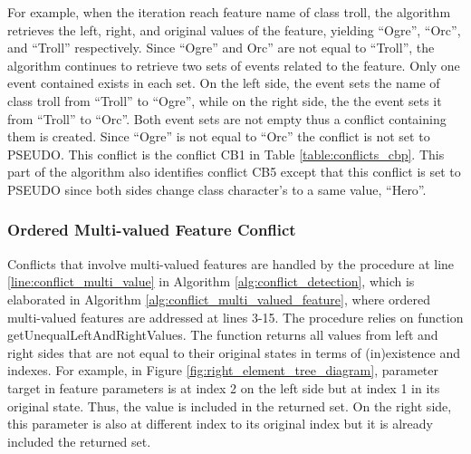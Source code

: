 For example, when the iteration reach feature \textsf{name} of class \textsf{troll}, the algorithm retrieves the left, right, and original values of the feature, yielding ``Ogre'', ``Orc'', and ``Troll'' respectively. Since ``Ogre'' and Orc'' are not equal to ``Troll'', the algorithm continues to retrieve two sets of events related to the feature. Only one event contained exists in each set. On the left side, the event sets the name of class \textsf{troll} from ``Troll'' to ``Ogre'', while on the right side, the the event sets it from ``Troll'' to ``Orc''. Both event sets are not empty thus a conflict containing them is created. Since ``Ogre'' is not equal to ``Orc'' the conflict is not set to \textsf{PSEUDO}. This conflict is the conflict \textsf{CB1} in Table \ref{table:conflicts_cbp}. This part of the algorithm also identifies conflict \textsf{CB5} except that this conflict is set to \textsf{PSEUDO} since both sides change class \textsf{character}'s  to a same value, ``Hero''.   

\subsubsection{Ordered Multi-valued Feature Conflict} 
\label{sec:ordered_conflict}
Conflicts that involve multi-valued features are handled by the procedure at line \ref{line:conflict_multi_value} in Algorithm \ref{alg:conflict_detection}, which is elaborated in Algorithm \ref{alg:conflict_multi_valued_feature}, where ordered multi-valued features are addressed at lines 3-15. The procedure relies on function \textsf{getUnequalLeftAndRightValues}. The function returns all values from left and right sides that are not equal to their original states in terms of (in)existence and indexes. For example, in Figure \ref{fig:right_element_tree_diagram}, parameter \textsf{target} in feature \textsf{parameters} is at index 2 on the left side but at index 1 in its original state. Thus, the value is included in the returned set. On the right side, this parameter is also at different index to its original index but it is already included the returned set. 

